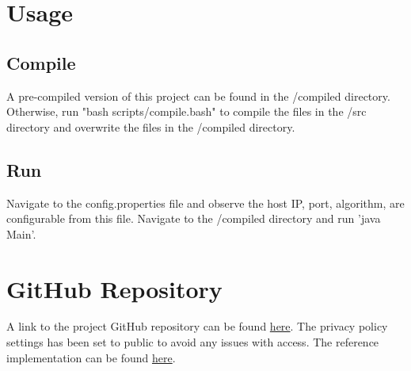\documentclass[a4paper]{article}
\begin{document}
\section{Usage}
\label{sec:section5}
\subsection{Compile}
A pre-compiled version of this project can be found in the /compiled directory. Otherwise, run "bash scripts/compile.bash" to compile the files in the /src directory and overwrite the files in the /compiled directory.

\subsection{Run}
Navigate to the config.properties file and observe the host IP, port, algorithm, are configurable from this file.
Navigate to the /compiled directory and run 'java Main'.

\section{GitHub Repository}
A link to the project GitHub repository can be found \href{https://github.com/shakeel-mohammed/client-server}{here}.
The privacy policy settings has been set to public to avoid any issues with access. The reference implementation can be found \href{https://github.com/distsys-MQ/ds-sim}{here}.



\end{document}
